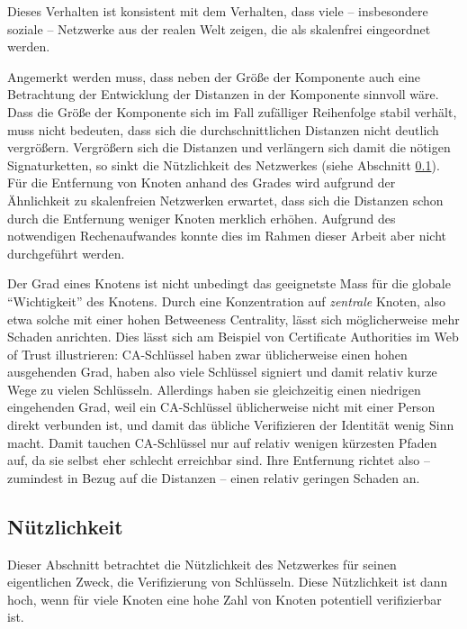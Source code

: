 Dieses Verhalten ist konsistent mit dem Verhalten, dass viele --
insbesondere soziale -- Netzwerke aus der realen Welt zeigen, die als
skalenfrei eingeordnet werden.

Angemerkt werden muss, dass neben der Größe der Komponente auch
eine Betrachtung der Entwicklung der Distanzen in der Komponente
sinnvoll wäre. Dass die Größe der Komponente sich im Fall
zufälliger Reihenfolge stabil verhält, muss nicht bedeuten, dass
sich die durchschnittlichen Distanzen nicht deutlich
vergrößern. Vergrößern sich die Distanzen und verlängern sich
damit die nötigen Signaturketten, so sinkt die Nützlichkeit des
Netzwerkes (siehe Abschnitt \ref{sec:nutzlichkeit}). Für die
Entfernung von Knoten anhand des Grades wird aufgrund der
Ähnlichkeit zu skalenfreien Netzwerken erwartet, dass sich die
Distanzen schon durch die Entfernung weniger Knoten merklich
erhöhen. Aufgrund des notwendigen Rechenaufwandes konnte dies im
Rahmen dieser Arbeit aber nicht durchgeführt werden.

Der Grad eines Knotens ist nicht unbedingt das geeignetste Mass für
die globale ``Wichtigkeit'' des Knotens. Durch eine Konzentration auf
\emph{zentrale} Knoten, also etwa solche mit einer hohen Betweeness
Centrality, lässt sich möglicherweise mehr Schaden anrichten. Dies
lässt sich am Beispiel von Certificate Authorities im Web of Trust
illustrieren: CA-Schlüssel haben zwar üblicherweise einen hohen
ausgehenden Grad, haben also viele Schlüssel signiert und damit
relativ kurze Wege zu vielen Schlüsseln. Allerdings haben sie
gleichzeitig einen niedrigen eingehenden Grad, weil ein CA-Schlüssel
üblicherweise nicht mit einer Person direkt verbunden ist, und damit
das übliche Verifizieren der Identität wenig Sinn macht. Damit tauchen
CA-Schlüssel nur auf relativ wenigen kürzesten Pfaden auf, da sie
selbst eher schlecht erreichbar sind. Ihre Entfernung richtet also --
zumindest in Bezug auf die Distanzen -- einen relativ geringen Schaden
an.

\subsection{Nützlichkeit}
\label{sec:nutzlichkeit}
Dieser Abschnitt betrachtet die Nützlichkeit des Netzwerkes für
seinen eigentlichen Zweck, die Verifizierung von Schlüsseln. Diese
Nützlichkeit ist dann hoch, wenn für viele Knoten eine hohe Zahl
von Knoten potentiell verifizierbar ist.

